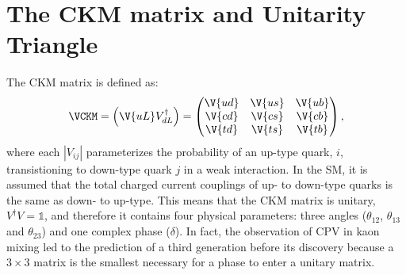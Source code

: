 \section{The CKM matrix and Unitarity Triangle}
\label{sec:ckm}

The CKM matrix is defined as:
\begin{equation}
  \VCKM = \left(\V{uL}V_{dL}^\dagger\right) =
  \begin{pmatrix}
    \V{ud} & \V{us} & \V{ub} \\
    \V{cd} & \V{cs} & \V{cb} \\
    \V{td} & \V{ts} & \V{tb} \\
  \end{pmatrix},
\end{equation}
where each $|V_{ij}|$ parameterizes the probability of an up-type quark, $i$, transistioning to
down-type quark $j$ in a weak interaction.
In the SM, it is assumed that the total charged current couplings of up- to down-type quarks is the
same as down- to up-type.
This means that the CKM matrix is unitary, $V^\dagger V = \mathbb{1}$, and therefore it contains
four physical parameters: three angles ($\theta_{12}$, $\theta_{13}$ and $\theta_{23}$) and one
complex phase ($\delta$).
In fact, the observation of CPV in kaon mixing led to the prediction of a third generation before
its discovery because a $3\times3$ matrix is the smallest necessary for a phase to enter a unitary
matrix.



